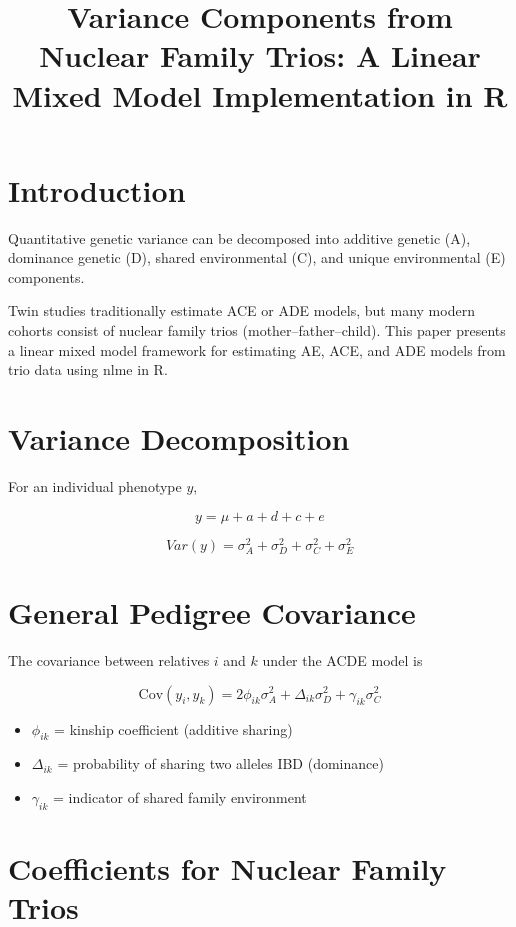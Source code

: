 \documentclass[12pt]{article}
\title{Variance Components from Nuclear Family Trios:
A Linear Mixed Model Implementation in R}
\author{}
\date{}
\begin{document}
\maketitle

\section{Introduction}

Quantitative genetic variance can be decomposed into additive genetic (A),
dominance genetic (D), shared environmental (C), and unique environmental (E)
components.

Twin studies traditionally estimate ACE or ADE models, but many modern
cohorts consist of nuclear family trios (mother--father--child).
This paper presents a linear mixed model framework for estimating AE, ACE,
and ADE models from trio data using nlme in R.

\section{Variance Decomposition}

For an individual phenotype $y$,

\[
y = \mu + a + d + c + e
\]

\[
Var(y) = \sigma_A^2 + \sigma_D^2 + \sigma_C^2 + \sigma_E^2
\]

\section{General Pedigree Covariance}

The covariance between relatives $i$ and $k$ under the ACDE model is

\[
\text{Cov}(y_i,y_k)
=
2\phi_{ik}\sigma_A^2
+ \Delta_{ik}\sigma_D^2
+ \gamma_{ik}\sigma_C^2
\]

\begin{itemize}
\item $\phi_{ik}$ = kinship coefficient (additive sharing)
\item $\Delta_{ik}$ = probability of sharing two alleles IBD (dominance)
\item $\gamma_{ik}$ = indicator of shared family environment
\end{itemize}

\section{Coefficients for Nuclear Family Trios}
\end{document}
